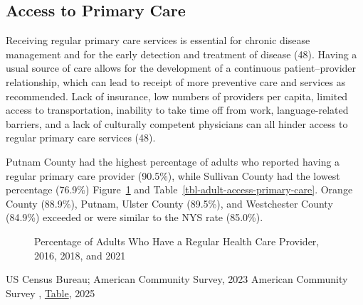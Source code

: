 \documentclass[
  english,
  letterpaper,
]{report}
\begin{document}
\subsection{Access to Primary Care}\label{access-to-primary-care}

Receiving regular primary care services is essential for chronic disease
management and for the early detection and treatment of disease (48).
Having a usual source of care allows for the development of a continuous
patient--provider relationship, which can lead to receipt of more
preventive care and services as recommended. Lack of insurance, low
numbers of providers per capita, limited access to transportation,
inability to take time off from work, language-related barriers, and a
lack of culturally competent physicians can all hinder access to regular
primary care services (48).

Putnam County had the highest percentage of adults who reported having a
regular primary care provider (90.5\%), while Sullivan County had the
lowest percentage (76.9\%) Figure~\ref{fig-adult-access-primary-care}
and Table~\ref{tbl-adult-access-primary-care}. Orange County (88.9\%),
Putnam, Ulster County (89.5\%), and Westchester County (84.9\%) exceeded
or were similar to the NYS rate (85.0\%).

\begin{figure}


\caption{\label{fig-adult-access-primary-care}Percentage of Adults Who
Have a Regular Health Care Provider, 2016, 2018, and 2021}

\end{figure}%

\begin{tcolorbox}[enhanced jigsaw, breakable, leftrule=.75mm, title=\textcolor{quarto-callout-note-color}{\faInfo}\hspace{0.5em}{Source}, bottomrule=.15mm, opacityback=0, left=2mm, colback=white, bottomtitle=1mm, coltitle=black, colbacktitle=quarto-callout-note-color!10!white, colframe=quarto-callout-note-color-frame, opacitybacktitle=0.6, toptitle=1mm, titlerule=0mm, arc=.35mm, rightrule=.15mm, toprule=.15mm]

US Census Bureau; American Community Survey, 2023 American Community
Survey , \href{}{Table}, 2025

\end{tcolorbox}
\end{document}
